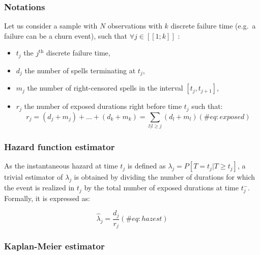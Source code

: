 \documentclass[
]{book}
\providecommand{\tightlist}{%
  \setlength{\itemsep}{0pt}\setlength{\parskip}{0pt}}
\begin{document}
\hypertarget{notations}{%
\subsubsection*{Notations}\label{notations}}

Let us consider a sample with \(N\) observations with \(k\) discrete failure time (e.g.~a failure can be a churn event), such that \(\forall j \in [\![1; k]\!]\) :

\begin{itemize}
\tightlist
\item
  \(t_j\) the \(j^{\text{th}}\) discrete failure time,
\item
  \(d_j\) the number of spells terminating at \(t_j\),
\item
  \(m_j\) the number of right-censored spells in the interval \([t_j, t_{j+1}]\),
\item
  \(r_j\) the number of exposed durations right before time \(t_j\) such that:
  \begin{equation}
  r_j = (d_j + m_j) + \dots + (d_k + m_k) = \sum_{l|l \geq j} (d_l + m_l)
  (\#eq:exposed)
  \end{equation}
\end{itemize}

\hypertarget{hazard-function-estimator}{%
\subsubsection*{Hazard function estimator}\label{hazard-function-estimator}}

As the instantaneous hazard at time \(t_j\) is defined as \(\lambda_j = P[T=t_j|T\geq t_j]\), a trivial estimator of \(\lambda_j\) is obtained by dividing the number of durations for which the event is realized in \(t_j\) by the total number of exposed durations at time \(t_j^{-}\). Formally, it is expressed as:

\begin{equation}
  \hat{\lambda}_j = \frac{d_j}{r_j}
  (\#eq:hazest)
\end{equation}

\hypertarget{kaplan-meier-estimator}{%
\subsubsection*{Kaplan-Meier estimator}\label{kaplan-meier-estimator}}
\end{document}
